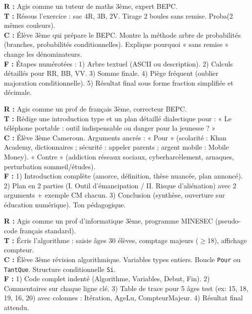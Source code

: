 \documentclass[11pt]{article}
\begin{document}
\begin{corrige}
\textbf{R :} Agis comme un tuteur de maths 3ème, expert BEPC. \\
\textbf{T :} Résous l'exercice : sac 4R, 3B, 2V. Tirage 2 boules sans remise. Proba(2 mêmes couleurs). \\
\textbf{C :} Élève 3ème qui prépare le BEPC. Montre la méthode arbre de probabilités (branches, probabilités conditionnelles). Explique pourquoi « sans remise » change les dénominateurs. \\
\textbf{F :} Étapes numérotées : 1) Arbre textuel (ASCII ou description). 2) Calculs détaillés pour RR, BB, VV. 3) Somme finale. 4) Piège fréquent (oublier majoration conditionnelle). 5) Résultat final sous forme fraction simplifiée et décimale.
\end{corrige}

\begin{corrige}
\textbf{R :} Agis comme un prof de français 3ème, correcteur BEPC. \\
\textbf{T :} Rédige une introduction type et un plan détaillé dialectique pour : « Le téléphone portable : outil indispensable ou danger pour la jeunesse ? » \\
\textbf{C :} Élève 3ème Cameroun. Arguments ancrés : « Pour » (scolarité : Khan Academy, dictionnaires ; sécurité : appeler parents ; argent mobile : Mobile Money). « Contre » (addiction réseaux sociaux, cyberharcèlement, arnaques, perturbation sommeil/études). \\
\textbf{F :} 1) Introduction complète (amorce, définition, thèse nuancée, plan annoncé). 2) Plan en 2 parties (I. Outil d'émancipation / II. Risque d'aliénation) avec 2 arguments + exemple CM chacun. 3) Conclusion (synthèse, ouverture sur éducation numérique). Ton pédagogique.
\end{corrige}

\begin{corrige}
\textbf{R :} Agis comme un prof d'informatique 3ème, programme MINESEC (pseudo-code français standard). \\
\textbf{T :} Écris l'algorithme : saisie âges 30 élèves, comptage majeurs ($\ge$18), affichage compteur. \\
\textbf{C :} Élève 3ème révision algorithmique. Variables types entiers. Boucle \texttt{Pour} ou \texttt{TantQue}. Structure conditionnelle \texttt{Si}. \\
\textbf{F :} 1) Code complet indenté (Algorithme, Variables, Debut, Fin). 2) Commentaires sur chaque ligne clé. 3) Table de trace pour 5 âges test (ex: 15, 18, 19, 16, 20) avec colonnes : Itération, AgeLu, CompteurMajeur. 4) Résultat final attendu.
\end{corrige}
\end{document}
